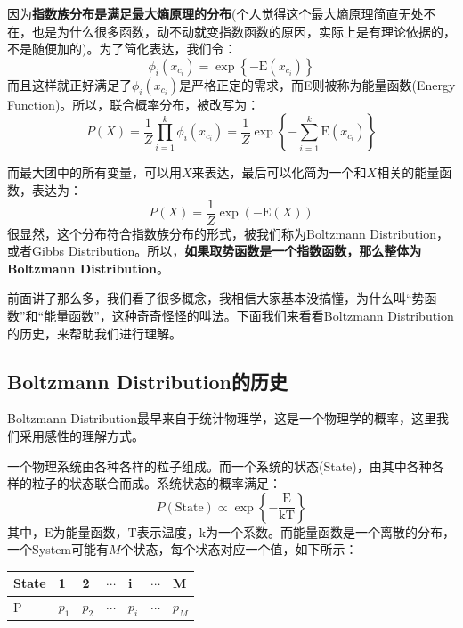 \documentclass[a4paper]{article}
\begin{document}
因为\textbf{指数族分布是满足最大熵原理的分布}(个人觉得这个最大熵原理简直无处不在，也是为什么很多函数，动不动就变指数函数的原因，实际上是有理论依据的，不是随便加的)。为了简化表达，我们令：
$$
\phi_i (x_{c_i}) = \exp \left\{ -\mathrm{E}(x_{c_i}) \right\}
$$
而且这样就正好满足了$\phi_i (x_{c_i})$是严格正定的需求，而E则被称为能量函数(Energy Function)。所以，联合概率分布，被改写为：
\begin{equation}
    P(X) = \frac{1}{Z} \prod_{i=1}^k \phi_i (x_{c_i}) = \frac{1}{Z} \exp\left\{ -\sum_{i=1}^k \mathrm{E}(x_{c_i}) \right\}
\end{equation}

而最大团中的所有变量，可以用$X$来表达，最后可以化简为一个和$X$相关的能量函数，表达为：
\begin{equation}
    P(X) = \frac{1}{Z} \exp (-\mathrm{E}(X))
\end{equation}
很显然，这个分布符合指数族分布的形式，被我们称为Boltzmann Distribution，或者Gibbs Distribution。所以，\textbf{如果取势函数是一个指数函数，那么整体为Boltzmann Distribution}。

前面讲了那么多，我们看了很多概念，我相信大家基本没搞懂，为什么叫“势函数”和“能量函数”，这种奇奇怪怪的叫法。下面我们来看看Boltzmann Distribution的历史，来帮助我们进行理解。

\subsection{Boltzmann Distribution的历史}
Boltzmann Distribution最早来自于统计物理学，这是一个物理学的概率，这里我们采用感性的理解方式。

一个物理系统由各种各样的粒子组成。而一个系统的状态(State)，由其中各种各样的粒子的状态联合而成。系统状态的概率满足：
\begin{equation}
    P(\mathrm{State}) \propto \exp \left\{ -\frac{\mathrm{E}}{\mathrm{kT}} \right\}
\end{equation}
其中，$\mathrm{E}$为能量函数，$\mathrm{T}$表示温度，$\mathrm{k}$为一个系数。而能量函数是一个离散的分布，一个System可能有$M$个状态，每个状态对应一个值，如下所示：
\begin{table}[H]
    \centering
    \begin{tabular}{l|llllll}
         State & 1& 2& $\cdots$&i & $\cdots$ & M \\
         \hline
        P   & $p_1$& $p_2$& $\cdots$ & $p_i$ & $\cdots$ & $p_M$ \\
    \end{tabular}
    \label{tab:my_label}
\end{table}
\end{document}
